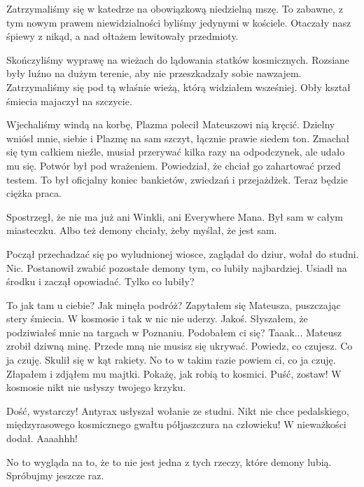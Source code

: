 Zatrzymaliśmy się w katedrze na obowiązkową niedzielną mszę.
To zabawne, z tym nowym prawem niewidzialności byliśmy jedynymi w kościele. 
Otaczały nasz śpiewy z nikąd, a nad ołtażem lewitowały przedmioty.

Skończyliśmy wyprawę na wieżach do lądowania statków kosmicznych.
Rozsiane były luźno na dużym terenie, aby nie przeszkadzały sobie nawzajem.
Zatrzymaliśmy się pod tą właśnie wieżą, którą widziałem wsześniej. 
Obły kształ śmiecia majaczył na szczycie.

Wjechaliśmy windą na korbę, Plazma polecił Mateuszowi nią kręcić.
Dzielny wniósł mnie, siebie i Plazmę na sam szczyt, łącznie prawie siedem ton. 
Zmachał się tym całkiem nieźle, musiał przerywać kilka razy na odpodczynek, ale udało mu się.
Potwór był pod wrażeniem. Powiedział, że chciał go zahartować przed testem. 
To był oficjalny koniec bankietów, zwiedzań i przejażdżek. Teraz będzie ciężka praca.

\divider{}

Spostrzegł, że nie ma już ani Winkli, ani Everywhere Mana. 
Był sam w całym miasteczku.
Albo też demony chciały, żeby myślał, że jest sam.

Począł przechadzać się po wyludnionej wiosce, zaglądał do dziur, wołał do studni. Nic.
Postanowił zwabić pozostałe demony tym, co lubiły najbardziej.
Usiadł na środku i zaczął opowiadać. Tylko co lubiły?

\divider{}

\begin{dialogue}
\ds{} To jak tam u ciebie? Jak minęła podróż? \dm{} Zapytałem się Mateusza, puszczając stery śmiecia. W kosmosie i tak w nic nie uderzy.
\ds{} Jakoś.
\ds{} Słyszałem, że podziwiałeś mnie na targach w Poznaniu. Podobałem ci się?
\ds{} Taaak... \dm{} Mateusz zrobił dziwną minę.
\ds{} Przede mną nie musisz się ukrywać. Powiedz, co czujesz.
\ds{} Co ja czuję. \dm{} Skulił się w kąt rakiety.
\ds{} No to w takim razie powiem ci, co ja czuję. \dm{} Złapałem i zdjąłem mu majtki. \dm{} Pokażę, jak robią to kosmici.
\ds{} Puść, zostaw!
\ds{} W kosmosie nikt nie usłyszy twojego krzyku.
\end{dialogue}

\divider{}

\begin{dialogue}
\ds{} Dość, wystarczy! \dm{} Antyrax usłyszał wołanie ze studni. \dm{} Nikt nie chce pedalskiego, międzyrasowego kosmicznego gwałtu półjaszczura na człowieku!
\ds{} W nieważkości \dm{} dodał.
\ds{} Aaaahhh!
\end{dialogue}
No to wygląda na to, że to nie jest jedna z tych rzeczy, które demony lubią.
Spróbujmy jeszcze raz.

